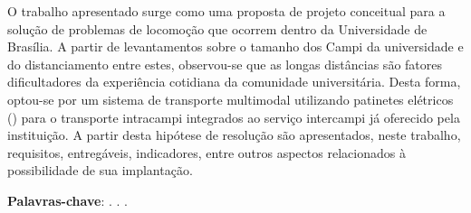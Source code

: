 \newpage
\setlength{\absparsep}{18pt} %
\begin{resumo}[Resumo]
O trabalho apresentado surge como uma proposta de projeto conceitual para a solução de problemas de locomoção que ocorrem dentro da Universidade de Brasília. A partir de levantamentos sobre o tamanho dos Campi da universidade e do distanciamento entre estes, observou-se que as longas distâncias são fatores dificultadores da experiência cotidiana da comunidade universitária. Desta forma, optou-se por um sistema de transporte multimodal utilizando patinetes elétricos () para o transporte intracampi integrados ao serviço intercampi já oferecido pela instituição. A partir desta hipótese de resolução são apresentados, neste trabalho, requisitos, entregáveis, indicadores, entre outros aspectos relacionados à possibilidade de sua implantação. 
\vspace{\onelineskip}

\noindent
\textbf{Palavras-chave}: \pchaveinome. \pchaveiinome. \pchaveiiinome. 
\end{resumo}